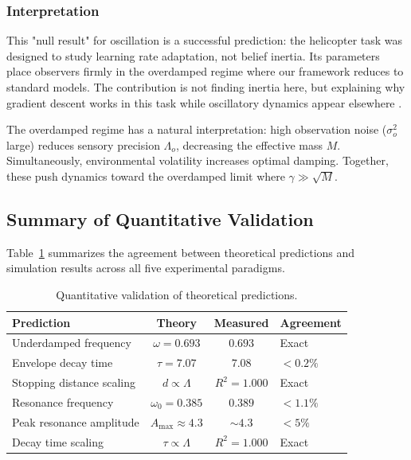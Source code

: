 \documentclass[12pt]{article}
\begin{document}
\subsubsection{Interpretation}

This "null result" for oscillation is a successful prediction: the helicopter task was designed to study learning rate adaptation, not belief inertia. Its parameters place observers firmly in the overdamped regime where our framework reduces to standard models. The contribution is not finding inertia here, but explaining why gradient descent works in this task while oscillatory dynamics appear elsewhere \citet{kaplowitz1992, burge2010}.

The overdamped regime has a natural interpretation: high observation noise ($\sigma_o^2$ large) reduces sensory precision $\Lambda_o$, decreasing the effective mass $M$. Simultaneously, environmental volatility increases optimal damping. Together, these push dynamics toward the overdamped limit where $\gamma \gg \sqrt{M}$.

\subsection{Summary of Quantitative Validation}

Table~\ref{tab:validation} summarizes the agreement between theoretical predictions and simulation results across all five experimental paradigms.

\begin{table}[htbp]
\centering
\caption{Quantitative validation of theoretical predictions.}
\label{tab:validation}
\begin{tabular}{lccl}
\toprule
\textbf{Prediction} & \textbf{Theory} & \textbf{Measured} & \textbf{Agreement} \\
\midrule
Underdamped frequency & $\omega = 0.693$ & $0.693$ & Exact \\
Envelope decay time & $\tau = 7.07$ & $7.08$ & $< 0.2\%$ \\
Stopping distance scaling & $d \propto \Lambda$ & $R^2 = 1.000$ & Exact \\
Resonance frequency & $\omega_0 = 0.385$ & $0.389$ & $< 1.1\%$ \\
Peak resonance amplitude & $A_{\max} \approx 4.3$ & $\sim 4.3$ & $< 5\%$ \\
Decay time scaling & $\tau \propto \Lambda$ & $R^2 = 1.000$ & Exact \\
\bottomrule
\end{tabular}
\end{table}
\end{document}
